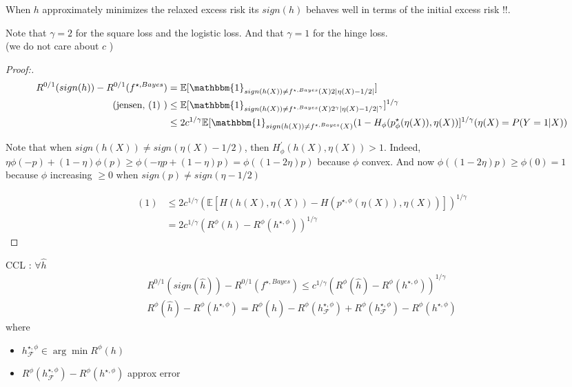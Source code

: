 When $ h $ approximately minimizes the relaxed excess risk its $ sign(h) $ behaves well in terms of the initial excess risk !!. 

\begin{note}[]
    Note that $ \gamma = 2 $  for the square loss and the logistic loss. And that $ \gamma = 1 $ for the hinge loss. \\
    (we do not care about $ c $ )
\end{note}

\begin{proof}[Proof:]
    \begin{align*}
        R^{0/1} (sign(h)) - R^{0/1}(f^{\star , Bayes }) &= \mathbb{E}[ \mathbbm{1}_{sign(h(X)) \neq  f^{\star , Bayes}(X) 2  \left| \eta (X) - 1/2 \right| }] \\
        \text{(jensen, (1) )} &\leq \mathbb{E}[ \mathbbm{1}_{sign(h(X)) \neq  f^{\star , Bayes}(X) 2^\gamma  \left| \eta (X) - 1/2 \right| ^\gamma }]^{1/\gamma } \\
                        &\leq 2 c^{1/\gamma } \mathbb{E}[\mathbbm{1}_{sign(h(X)) \neq  f^{\star , Bayes}(X) } (1 - H_ \phi (p^\star _\phi  (\eta (X)) , \eta (X))]^{1/\gamma} (\eta (X) = P (Y=1 | X))
    \end{align*}
    \begin{note}[]
        Note that when $ sign(h(X)) \neq sign(\eta (X) - 1/2) $, then $ H_\phi ^\prime ( h(X), \eta (X) ) > 1 $. Indeed, $ \eta \phi (-p) + (1 - \eta ) \phi (p) \geq \phi ( - \eta  p + (1 - \eta ) p) = \phi ((1 - 2 \eta ) p )$ because $ \phi  $ convex. And now $ \phi ((1 - 2 \eta ) p) \geq  \phi (0) = 1 $ because $ \phi  $ increasing $ \geq 0 $ when $ sign(p) \neq sign(\eta - 1/2) $ 
    \end{note}
    
    \begin{align*}
        (1) &\leq  2 c^{1/\gamma } ( \mathbb{E} [ H( h(X), \eta (X)) - H(p^{\star , \phi }(\eta (X)), \eta (X)) ])^{1/\gamma } \\ 
            &= 2c ^{1/\gamma } ( R^\phi (h) - R^\phi (h^{\star , \phi }) )^{1/\gamma }
    \end{align*}
    
\end{proof}

CCL : $ \forall \hat{h} $ 
\begin{align*}
    R^{0/1} ( sign(\hat{h}) ) - R^{0/1} (f^{\star , Bayes }) \leq c^{1/\gamma } ( R^\phi (\hat{h}) - R^\phi (h^{\star , \phi }))^{1/\gamma } \\
    R^\phi ( \hat{h} ) - R^\phi ( h^{\star , \phi } ) = R^\phi (\hat{h}) - R^\phi (h^{\star , \phi }_\mathcal{F} ) + R^\phi (h^{\star , \phi }_\mathcal{F}) - R^\phi ( h^{\star , \phi } ) 
\end{align*}
where \begin{itemize}
    \item $ h^{\star , \phi }_\mathcal{F} \in \arg \min R^\phi (h) $ 
    \item $ R^\phi (h^{\star , \phi }_\mathcal{F}) - R^\phi ( h^{\star , \phi } ) $  approx error
\end{itemize}



